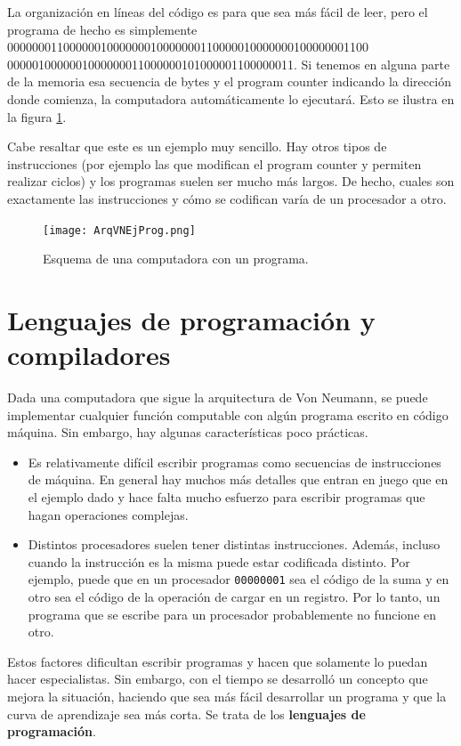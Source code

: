 \documentclass[a4paper, 12pt]{report}
\theoremstyle{definition}
\begin{document}
La organización en líneas del código es para que sea más fácil de leer, pero el programa de hecho es simplemente 0000000110000001000000010000000110000010000000100000001100 0000010000001000000011000000101000001100000011. Si tenemos en alguna parte de la memoria esa secuencia de bytes y el program counter indicando la dirección donde comienza, la computadora automáticamente lo ejecutará. Esto se ilustra en la figura \ref{fig-ArqVNEjProg}.

Cabe resaltar que este es un ejemplo muy sencillo. Hay otros tipos de instrucciones (por ejemplo las que modifican el program counter y permiten realizar ciclos) y los programas suelen ser mucho más largos. De hecho, cuales son exactamente las instrucciones y cómo se codifican varía de un procesador a otro.

\begin{figure}
	\centering
	\texttt{[image: ArqVNEjProg.png]}
	\caption{Esquema de una computadora con un programa.}
	\label{fig-ArqVNEjProg}
\end{figure}

\section{Lenguajes de programación y compiladores}

Dada una computadora que sigue la arquitectura de Von Neumann, se puede implementar cualquier función computable con algún programa escrito en código máquina. Sin embargo, hay algunas características poco prácticas.
\begin{itemize}
	\item Es relativamente difícil escribir programas como secuencias de instrucciones de máquina. En general hay muchos más detalles que entran en juego que en el ejemplo dado y hace falta mucho esfuerzo para escribir programas que hagan operaciones complejas.
	\item Distintos procesadores suelen tener distintas instrucciones. Además, incluso cuando la instrucción es la misma puede estar codificada distinto. Por ejemplo, puede que en un procesador {\tt 00000001} sea el código de la suma y en otro sea el código de la operación de cargar en un registro. Por lo tanto, un programa que se escribe para un procesador probablemente no funcione en otro.
\end{itemize}
Estos factores dificultan escribir programas y hacen que solamente lo puedan hacer especialistas. Sin embargo, con el tiempo se desarrolló un concepto que mejora la situación, haciendo que sea más fácil desarrollar un programa y que la curva de aprendizaje sea más corta. Se trata de los {\bf lenguajes de programación}.
\end{document}
